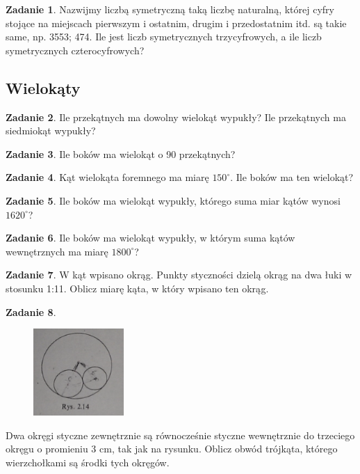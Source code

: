 \documentclass[11pt]{article}
\theoremstyle{definition}
\newtheorem{zad}{Zadanie}
\begin{document}
\begin{zad}
Nazwijmy liczbą symetryczną taką liczbę naturalną, której cyfry stojące na miejscach pierwszym i ostatnim, drugim i przedostatnim itd. są takie same, np. 3553; 474. Ile jest liczb symetrycznych trzycyfrowych, a ile liczb symetrycznych czterocyfrowych?
\end{zad}

\subsection{Wielokąty}

\begin{zad}
Ile przekątnych ma dowolny wielokąt wypukły? Ile przekątnych ma siedmiokąt wypukły?
\end{zad}

\begin{zad}
Ile boków ma wielokąt o 90 przekątnych?
\end{zad}

\begin{zad}
Kąt wielokąta foremnego ma miarę $150^\circ$. Ile boków ma ten wielokąt?
\end{zad}

\begin{zad}
Ile boków ma wielokąt wypukły, którego suma miar kątów wynosi $1620^\circ$?
\end{zad}

\begin{zad}
Ile boków ma wielokąt wypukły, w którym suma kątów wewnętrznych ma miarę $1800^\circ$?
\end{zad}

\begin{zad}
W kąt wpisano okrąg. Punkty styczności dzielą okrąg na dwa łuki w stosunku 1:11. Oblicz miarę kąta, w który wpisano ten okrąg.
\end{zad}

\begin{zad}

\begin{figure}[h]
\centering
\includegraphics[width=0.4\linewidth]{rys214.png}
\end{figure}

Dwa okręgi styczne zewnętrznie są równocześnie styczne wewnętrznie do trzeciego okręgu o promieniu 3 cm, tak jak na rysunku. Oblicz obwód trójkąta, którego wierzchołkami są środki tych okręgów.

\end{zad}
\end{document}
